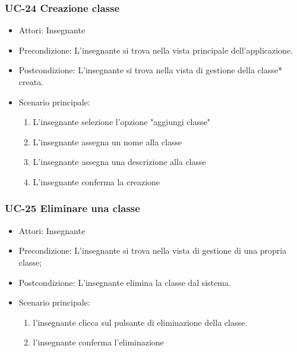 \subsubsection{UC-24 Creazione classe}

\begin{itemize}
	\item Attori: Insegnante
	\item Precondizione: L'insegnante si trova nella vista principale dell'applicazione.
	\item Postcondizione: L'insegnante si trova nella vista di gestione della classe* creata.
	\item Scenario principale:
	\begin{enumerate}
		\item L'insegnante selezione l'opzione "aggiungi classe"
		\item L'insegnante assegna un nome alla classe
		\item L'insegnante assegna una descrizione alla classe
		\item L'insegnante conferma la creazione
	\end{enumerate}

\end{itemize}

\subsubsection{UC-25 Eliminare una classe}
\begin{itemize}
	\item Attori: Insegnante
	\item Precondizione: L'insegnante si trova nella vista di gestione di una propria classe;
	\item Postcondizione: L'insegnante elimina la classe dal sistema.
	\item Scenario principale:
	\begin{enumerate}
		\item l'insegnante clicca sul pulsante di eliminazione della classe.
		\item l'insegnante conferma l'eliminazione
	\end{enumerate}
\end{itemize}

